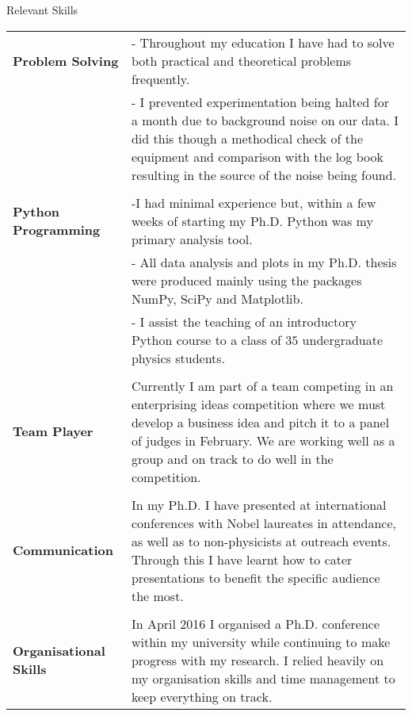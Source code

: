 \documentclass{resume} %
\begin{document}
\begin{rSection}{Relevant Skills}
\begin{tabular}{p{5cm}p{10.5cm}}
	{\bf Problem Solving}& {- Throughout my education I have had to solve both practical and theoretical problems frequently.}\\ 
	{}&{- I prevented experimentation being halted for a month due to background noise on our data. I did this though a methodical check of the equipment and comparison with the log book resulting in the source of the noise being found.}\\ \\
	
	{\bf Python Programming}& {-I had minimal experience but, within a few weeks of starting my Ph.D. Python was my primary analysis tool.}\\ 
	{}& {- All data analysis and plots in my Ph.D. thesis were produced mainly using the packages NumPy, SciPy and Matplotlib.}\\
	{}& {- I assist the teaching of an introductory Python course to a class of $35$ undergraduate physics students.}\\ \\
	
	{\bf Team Player}& {Currently I am part of a team competing in an enterprising ideas competition where we must develop a business idea and pitch it to a panel of judges in February. We are working well as a group and on track to do well in the competition.}\\ \\
	
	{\bf Communication}& {In my Ph.D. I have presented at international conferences with Nobel laureates in attendance, as well as to non-physicists at outreach events. Through this I have learnt how to cater presentations to benefit the specific audience the most.}\\ \\
	
	{\bf Organisational Skills}& {In April 2016 I organised a Ph.D. conference within my university while continuing to make progress with my research. I relied heavily on my organisation skills and time management to keep everything on track.}
\end{tabular}


\end{rSection}
\end{document}
